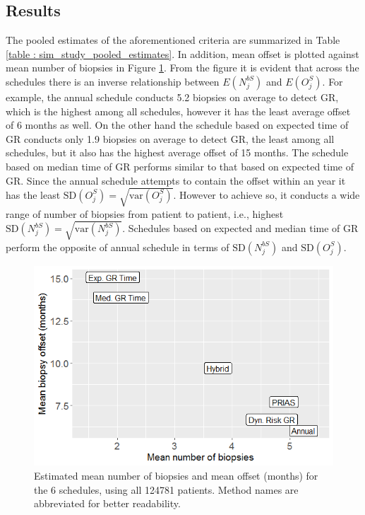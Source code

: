 \subsection{Results}
The pooled estimates of the aforementioned criteria are summarized in Table \ref{table : sim_study_pooled_estimates}. In addition, mean offset is plotted against mean number of biopsies in Figure \ref{fig : meanNbVsOffset}. From the figure it is evident that across the schedules there is an inverse relationship between $E(N^{bS}_j)$ and $E(O^S_j)$. For example, the annual schedule conducts 5.2 biopsies on average to detect GR, which is the highest among all schedules, however it has the least average offset of 6 months as well. On the other hand the schedule based on expected time of GR conducts only 1.9 biopsies on average to detect GR, the least among all schedules, but it also has the highest average offset of 15 months. The schedule based on median time of GR performs similar to that based on expected time of GR. Since the annual schedule attempts to contain the offset within an year it has the least $\mbox{SD}(O^S_j) = \sqrt{\mbox{var}(O^S_j)}$. However to achieve so, it conducts a wide range of number of biopsies from patient to patient, i.e., highest $\mbox{SD}(N^{bS}_j) = \sqrt{\mbox{var}(N^{bS}_j)}$. Schedules based on expected and median time of GR perform the opposite of annual schedule in terms of $\mbox{SD}(N^{bS}_j)$ and $\mbox{SD}(O^S_j)$.

\begin{figure}
\centerline{\includegraphics[width=\columnwidth]{images/sim_study/meanNbVsOffset_all.png}}
\caption{Estimated mean number of biopsies and mean offset (months) for the 6 schedules, using all 124781 patients. Method names are abbreviated for better readability.}
\label{fig : meanNbVsOffset}
\end{figure}

